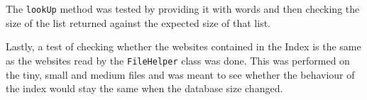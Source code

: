 The {\tt lookUp} method was tested by providing it with words and then checking the size of the list returned against the expected size of that list.

Lastly, a test of checking whether the websites contained in the Index is the same as the websites read by the {\tt FileHelper} class was done.
This was performed on the tiny, small and medium files and was meant to see whether the behaviour of the index would stay the same when the
database size changed.


